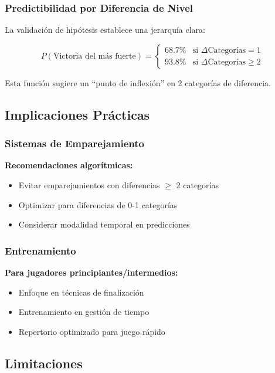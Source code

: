 \documentclass[11pt,a4paper]{article}
\begin{document}
\subsubsection{Predictibilidad por Diferencia de Nivel}

La validaci\'on de hip\'otesis establece una jerarqu\'ia clara:

\begin{equation}
P(\text{Victoria del m\'as fuerte}) = \begin{cases}
68.7\% & \text{si } \Delta\text{Categor\'ias} = 1 \\
93.8\% & \text{si } \Delta\text{Categor\'ias} \geq 2
\end{cases}
\end{equation}

Esta funci\'on sugiere un ``punto de inflexi\'on'' en 2 categor\'ias de diferencia.

\subsection{Implicaciones Pr\'acticas}

\subsubsection{Sistemas de Emparejamiento}

\textbf{Recomendaciones algor\'itmicas:}
\begin{itemize}
\item Evitar emparejamientos con diferencias $\geq$ 2 categor\'ias
\item Optimizar para diferencias de 0-1 categor\'ias
\item Considerar modalidad temporal en predicciones
\end{itemize}

\subsubsection{Entrenamiento}

\textbf{Para jugadores principiantes/intermedios:}
\begin{itemize}
\item Enfoque en t\'ecnicas de finalizaci\'on
\item Entrenamiento en gesti\'on de tiempo
\item Repertorio optimizado para juego r\'apido
\end{itemize}

\subsection{Limitaciones}
\end{document}

